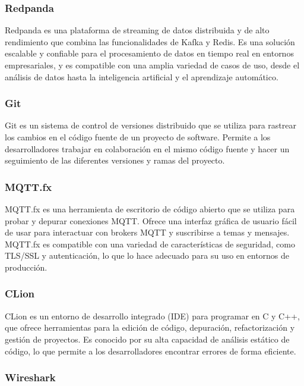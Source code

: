 \subsubsection{Redpanda}

Redpanda \citep{redpanda} es una plataforma de streaming de datos distribuida y de alto rendimiento que combina las funcionalidades de Kafka y Redis. Es una solución escalable y confiable para el procesamiento de datos en tiempo real en entornos empresariales, y es compatible con una amplia variedad de casos de uso, desde el análisis de datos hasta la inteligencia artificial y el aprendizaje automático.


\subsubsection{Git}

Git \citep{git} es un sistema de control de versiones distribuido que se utiliza para rastrear los cambios en el código fuente de un proyecto de software. Permite a los desarrolladores trabajar en colaboración en el mismo código fuente y hacer un seguimiento de las diferentes versiones y ramas del proyecto. 


\subsubsection{MQTT.fx}

MQTT.fx \citep{mqtt-fx} es una herramienta de escritorio de código abierto que se utiliza para probar y depurar conexiones MQTT. Ofrece una interfaz gráfica de usuario fácil de usar para interactuar con brokers MQTT y suscribirse a temas y mensajes. MQTT.fx es compatible con una variedad de características de seguridad, como TLS/SSL y autenticación, lo que lo hace adecuado para su uso en entornos de producción.


\subsubsection{CLion}

CLion \citep{clion} es un entorno de desarrollo integrado (IDE) para programar en C y C++, que ofrece herramientas para la edición de código, depuración, refactorización y gestión de proyectos. Es conocido por su alta capacidad de análisis estático de código, lo que permite a los desarrolladores encontrar errores de forma eficiente.


\subsubsection{Wireshark}

